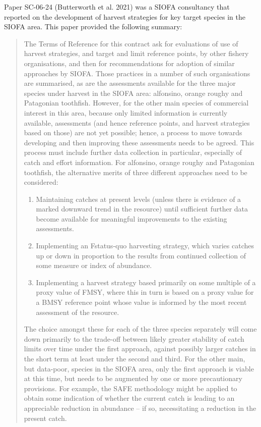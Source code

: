 Paper SC-06-24 (Butterworth et al. 2021) was a SIOFA consultancy that reported on the development of harvest strategies for key target species in the SIOFA area. This paper provided the following summary:
\begin{quote}
	The Terms of Reference for this contract ask for evaluations of use of harvest strategies, and target and limit reference points, by other fishery organisations, and then for recommendations for adoption of similar approaches by SIOFA. Those practices in a number of such organisations are summarised, as are the assessments available for the three major species under harvest in the SIOFA area: alfonsino, orange roughy and Patagonian toothfish. However, for the other main species of commercial interest in this area, because only limited information is currently available, assessments (and hence reference points, and harvest strategies based on those) are not yet possible; hence, a process to move towards developing and then improving these assessments needs to be agreed. This process must include further data collection in particular, especially of catch and effort information.
	For alfonsino, orange roughy and Patagonian toothfish, the alternative merits of three different approaches need to be considered:
	\begin{enumerate}
		\item Maintaining catches at present levels (unless there is evidence of a marked downward trend in the resource) until sufficient further data become available for meaningful improvements to the existing assessments.
		\item Implementing an Fstatus-quo harvesting strategy, which varies catches up or down in proportion to the results from continued collection of some measure or index of abundance.
		\item Implementing a harvest strategy based primarily on some multiple of a proxy value of FMSY, where this in turn is based on a proxy value for a BMSY reference point whose value is informed by the most recent assessment of the resource.
	\end{enumerate}
	The choice amongst these for each of the three species separately will come down primarily to the trade-off between likely greater stability of catch limits over time under the first approach, against possibly larger catches in the short term at least under the second and third.
	For the other main, but data-poor, species in the SIOFA area, only the first approach is viable at this time, but needs to be augmented by one or more precautionary provisions. For example, the SAFE methodology might be applied to obtain some indication of whether the current catch is leading to an appreciable reduction in abundance – if so, necessitating a reduction in the present catch.
\end{quote}

